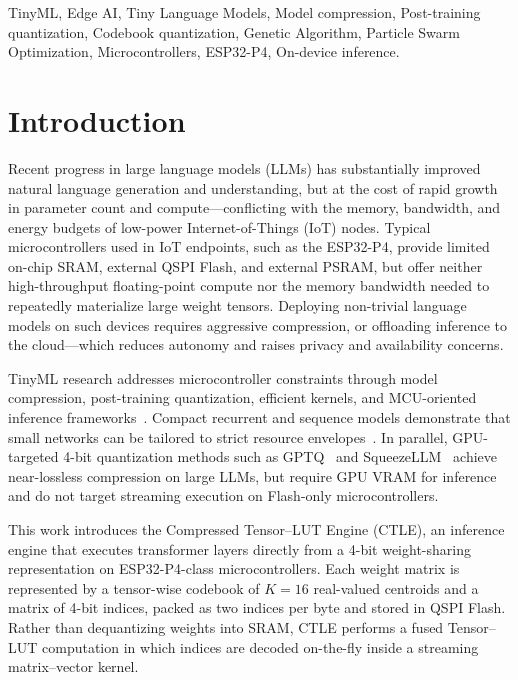 \documentclass[lettersize,journal]{IEEEtran}
\begin{document}
\begin{IEEEkeywords}
TinyML, Edge AI, Tiny Language Models, Model compression, Post-training
quantization, Codebook quantization, Genetic Algorithm, Particle Swarm
Optimization, Microcontrollers, ESP32-P4, On-device inference.
\end{IEEEkeywords}


\section{Introduction}
\label{sec:intro}

Recent progress in large language models (LLMs) has substantially improved
natural language generation and understanding, but at the cost of rapid growth
in parameter count and compute---conflicting with the memory, bandwidth, and
energy budgets of low-power Internet-of-Things (IoT) nodes.
Typical microcontrollers used in IoT endpoints, such as the ESP32-P4, provide
limited on-chip SRAM, external QSPI Flash, and external PSRAM, but offer
neither high-throughput floating-point compute nor the memory bandwidth needed
to repeatedly materialize large weight tensors.
Deploying non-trivial language models on such devices requires aggressive
compression, or offloading inference to the cloud---which reduces autonomy and
raises privacy and availability concerns.

TinyML research addresses microcontroller constraints through model compression,
post-training quantization, efficient kernels, and MCU-oriented inference
frameworks~\cite{Saha2022,Novac2021,Elhanashi2024}.
Compact recurrent and sequence models demonstrate that small networks can be
tailored to strict resource envelopes~\cite{Kusupati2018,Kannan2021,Cheng2024}.
In parallel, GPU-targeted 4-bit quantization methods such as
GPTQ~\cite{frantar2023gptq} and SqueezeLLM~\cite{kim2024squeezellm} achieve
near-lossless compression on large LLMs, but require GPU VRAM for inference
and do not target streaming execution on Flash-only microcontrollers.

This work introduces the Compressed Tensor--LUT Engine (CTLE), an inference
engine that executes transformer layers directly from a 4-bit weight-sharing
representation on ESP32-P4-class microcontrollers.
Each weight matrix is represented by a tensor-wise codebook of $K=16$
real-valued centroids and a matrix of 4-bit indices, packed as two indices per
byte and stored in QSPI Flash.
Rather than dequantizing weights into SRAM, CTLE performs a fused
Tensor--LUT computation in which indices are decoded on-the-fly inside a
streaming matrix--vector kernel.
\end{document}
